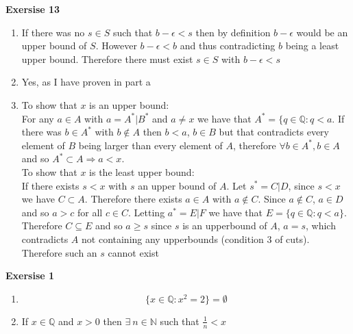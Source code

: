 \documentclass[12pt]{article}
\newcounter{ques}[section]
\newenvironment{ques}[1]{\textbf{Exersise #1} \vspace{1mm}}{\medskip}
\theoremstyle{definition}
\begin{document}
\begin{ques}{13}
	\begin{enumerate}
		\item
			If there was no $s \in S$ such that $b - \epsilon < s$
			then by definition $b - \epsilon$ would be an upper
			bound of $S$. However $b - \epsilon < b$ and thus
			contradicting $b$ being a least upper bound. Therefore
			there must exist $s \in S$ with $b - \epsilon < s$
		\item
			Yes, as I have proven in part a
		\item
			To show that $x$ is an upper bound:\\
			For any $a \in A$ with $a = A^*|B^*$ and $a \neq x$ we
			have that $A^* = \{q \in \mathbb Q: q < a$. If there
			was $b \in A^*$ with $b \notin A$ then $b < a$, $b \in
			B$ but that contradicts every element of $B$ being
			larger than every element of $A$, therefore $\forall b
			\in A^*, b \in A$ and so $A^* \subset A \Rightarrow a
			<x$.\\
			To show that $x$ is the least upper bound:\\
			If there exists $s < x$ with $s$ an upper bound of $A$.
			Let $s^* = C|D$, since $s < x$ we have $C \subset A$.
			Therefore there exists $a \in A$ with $a \notin C$.
			Since $a \notin C$, $a \in D$ and so $a > c$ for all $c
			\in C$. Letting $a^* = E|F$ we have that $E = \{q \in
			\mathbb Q: q < a\}$. Therefore $C \subseteq E$ and so
			$a \geq s$ since $s$ is an upperbound of $A$, $a = s$,
			which contradicts $A$ not containing any upperbounds
			(condition 3 of cuts). Therefore such an $s$ cannot
			exist



	\end{enumerate}
\end{ques}

\begin{ques}{1}
	\begin{enumerate}
		\item
			$$\{x \in \mathbb Q: x^2 = 2\} = \emptyset$$
		\item
			If $x \in \mathbb Q$ and $x > 0$ then $\exists \ n \in
			\mathbb N$ such that $\frac 1 n < x$

	\end{enumerate}
\end{ques}
\end{document}
